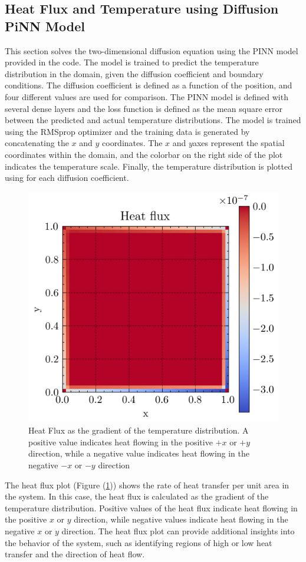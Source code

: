 \subsection{Heat Flux and Temperature using Diffusion PiNN Model}

This section solves the two-dimensional diffusion equation using the PINN model provided in the code. The model is trained to predict the temperature distribution in the domain, given the diffusion coefficient and boundary conditions. The diffusion coefficient is defined as a function of the position, and four different values are used for comparison. The PINN model is defined with several dense layers and the loss function is defined as the mean square error between the predicted and actual temperature distributions. The model is trained using the RMSprop optimizer and the training data is generated by concatenating the $x$ and $y$ coordinates. The $x$ and $y $axes represent the spatial coordinates within the domain, and the colorbar on the right side of the plot indicates the temperature scale. Finally, the temperature distribution is plotted using for each diffusion coefficient. 

\begin{figure}[htb!]
\begin{center}
\includegraphics[width=.49\textwidth]{images/heat_flux.png}
\vspace*{-8mm}
\caption{Heat Flux as the gradient of the temperature distribution. A positive value indicates heat flowing in the positive $+x$ or $+y$ direction, while a negative value indicates heat flowing in the negative $-x$ or $-y$ direction}
\label{fig:hf}
\end{center}
\end{figure}

The heat flux plot (Figure (\ref{fig:hf})) shows the rate of heat transfer per unit area in the system. In this case, the heat flux is calculated as the gradient of the temperature distribution. Positive values of the heat flux indicate heat flowing in the positive $x$ or $y$ direction, while negative values indicate heat flowing in the negative $x$ or $y$ direction. The heat flux plot can provide additional insights into the behavior of the system, such as identifying regions of high or low heat transfer and the direction of heat flow.

